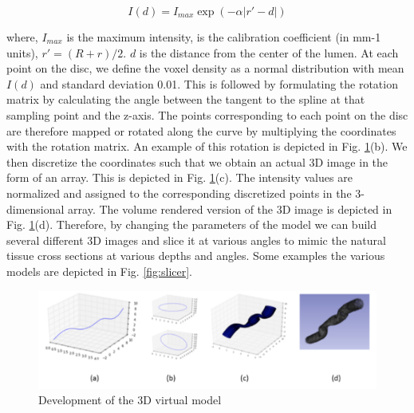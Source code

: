 \begin{equation}
I(d) = I_{max} \exp(- \alpha |r\prime - d|)
\label{eq:1}
\end{equation}


where, $I_{max}$  is the maximum intensity, is the calibration coefficient (in mm-1 units), $r\prime=(R+r)/2.$ $d$ is the distance from the center of the lumen. At each point on the disc, we define the voxel density as a normal distribution with mean $I(d)$ and standard deviation 0.01. This is followed by formulating the rotation matrix by calculating the angle between the tangent to the spline at that sampling point and the z-axis. The points corresponding to each point on the disc are therefore mapped or rotated along the curve by multiplying the coordinates with the rotation matrix. An example of this rotation is depicted in Fig. \ref{fig:3D_model}(b). We then discretize the coordinates such that we obtain an actual 3D image in the form of an array. This is depicted in Fig. \ref{fig:3D_model}(c). The intensity values are normalized and assigned to the corresponding discretized points in the 3-dimensional array. The volume rendered version of the 3D image is depicted in Fig. \ref{fig:3D_model}(d). Therefore, by changing the parameters of the model we can build several different 3D images and slice it at various angles to mimic the natural tissue cross sections at various depths and angles. Some examples the various models are depicted in Fig. \ref{fig:slicer}.

\begin{figure}[H]
\centering
\includegraphics[width=1.0\textwidth]{img/3D_model}
\caption{Development of the 3D virtual model}
\label{fig:3D_model}
\end{figure}

